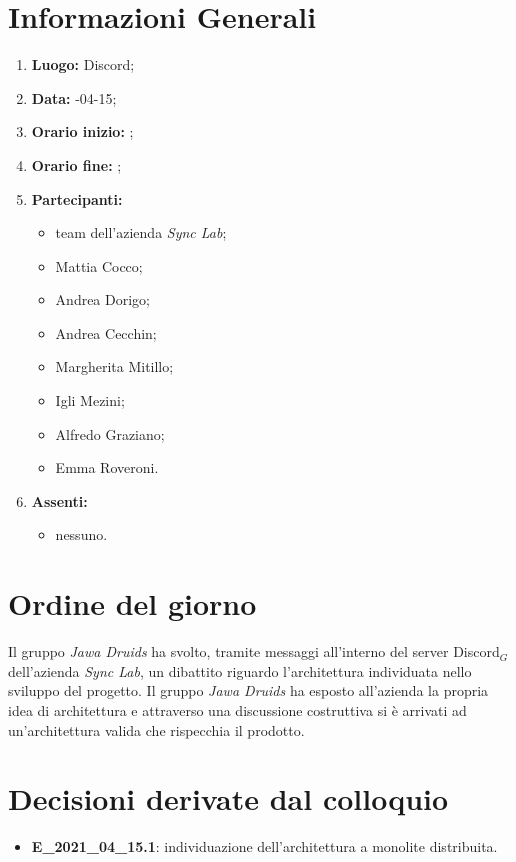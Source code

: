 \newpage
\section{Informazioni Generali}
\begin{enumerate}
	\item \textbf{Luogo:} \normalfont Discord;
	\item \textbf{Data:} -04-15;
	\item \textbf{Orario inizio:} ;
	\item \textbf{Orario fine:} ;
	\item \textbf{Partecipanti:}
	\begin{itemize}
		\item team dell'azienda \textit{Sync Lab};
		\item Mattia Cocco;
		\item Andrea Dorigo;
		\item Andrea Cecchin;
		\item Margherita Mitillo;
		\item Igli Mezini;
		\item Alfredo Graziano;
		\item Emma Roveroni.
	\end{itemize}
	\item \textbf{Assenti:}
	\begin{itemize}
		\item nessuno.
	\end{itemize}
\end{enumerate}
\section{Ordine del giorno}
Il gruppo \textit{Jawa Druids} ha svolto, tramite messaggi all'interno del server Discord$_G$ dell'azienda \textit{Sync Lab}, un dibattito riguardo l'architettura individuata nello sviluppo del progetto. 
Il gruppo \textit{Jawa Druids} ha esposto all'azienda la propria idea di architettura e attraverso una discussione costruttiva si è arrivati ad un'architettura valida che rispecchia il prodotto. 
\section{Decisioni derivate dal colloquio}
\begin{itemize}
	\item \textbf{E\_2021\_04\_15.1}: individuazione dell'architettura a monolite distribuita.
\end{itemize}